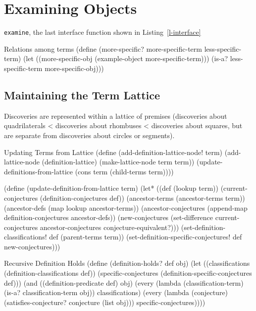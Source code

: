 \section{Examining Objects}

\texttt{examine}, the last interface function shown in
Listing~\ref{l-interface}

\begin{code-listing}
[label=more-specific]
{Relations among terms}
(define (more-specific? more-specific-term less-specific-term)
  (let ((more-specific-obj (example-object more-specific-term)))
    (is-a? less-specific-term more-specific-obj)))
\end{code-listing}


\subsection{Maintaining the Term Lattice}

Discoveries are represented within a lattice of premises (discoveries
about quadrilaterals < discoveries about rhombuses < discoveries about
squares, but are separate from discoveries about circles or segments).

\begin{code-listing}
[label=updating-terms]
{Updating Terms from Lattice}
(define (add-definition-lattice-node! term)
  (add-lattice-node (definition-lattice) (make-lattice-node term term))
  (update-definitions-from-lattice (cons term (child-terms term))))

(define (update-definition-from-lattice term)
  (let* ((def (lookup term))
         (current-conjectures (definition-conjectures def))
         (ancestor-terms (ancestor-terms term))
         (ancestor-defs (map lookup ancestor-terms))
         (ancestor-conjectures
          (append-map definition-conjectures ancestor-defs))
         (new-conjectures
          (set-difference current-conjectures
                          ancestor-conjectures
                          conjecture-equivalent?)))
    (set-definition-classifications! def (parent-terms term))
    (set-definition-specific-conjectures! def new-conjectures)))
\end{code-listing}

\begin{code-listing}
[label=def-holds-2]
{Recursive Definition Holds}
(define (definition-holds? def obj)
  (let ((classifications (definition-classifications def))
        (specific-conjectures (definition-specific-conjectures def)))
    (and ((definition-predicate def) obj)
         (every (lambda (classification-term)
                  (is-a? classification-term obj))
                classifications)
         (every (lambda (conjecture)
                  (satisfies-conjecture? conjecture (list obj)))
                specific-conjectures))))
\end{code-listing}

